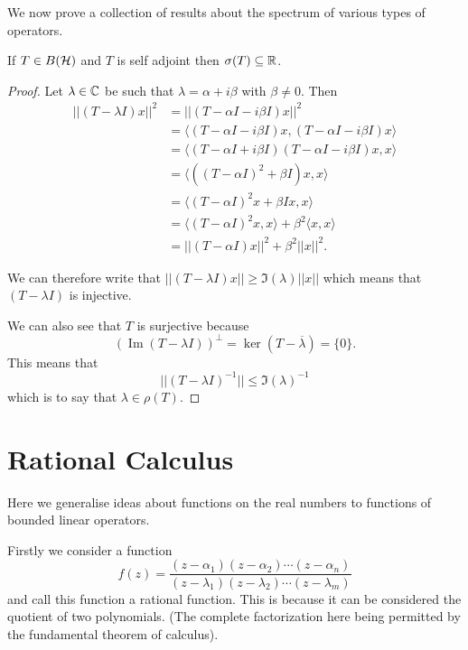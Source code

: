 \documentclass{unswmaths}
\begin{document}
We now prove a collection of results about the spectrum of various types of operators.

\begin{theorem}
	If $ T \in B(\mathcal{H}) $ and $ T $ is self adjoint then $ \sigma(T) \subseteq \mathbb{R} $.
\end{theorem}
\begin{proof}
	Let $ \lambda \in \mathbb{C} $ be such that $ \lambda = \alpha + i \beta $ with $ \beta \neq 0 $.
	Then 
	\begin{align*}
		||(T - \lambda I)x||^2 &= ||( T - \alpha I - i \beta I)x||^2 \\
			&= \langle (T - \alpha I - i \beta I)x, (T - \alpha I - i \beta I)x \rangle \\
			&= \langle (T - \alpha I + i \beta I) (T - \alpha I - i \beta I)x,x \rangle \\
			&= \langle \left((T - \alpha I)^2 + \beta I \right)x,x \rangle \\
			&= \langle (T - \alpha I)^2x + \beta Ix ,x \rangle \\
			&= \langle (T - \alpha I)^2 x, x \rangle + \beta^2 \langle x, x\rangle \\
			&= ||(T-\alpha I)x||^2 + \beta^2 ||x||^2.
	\end{align*}
	
	We can therefore write that $ || (T- \lambda I)x || \geq \Im(\lambda)||x|| $ which means that
	$ (T - \lambda I ) $ is injective.
	
	We can also see that $ T $ is surjective because
	$$
		\left(\operatorname{Im}(T - \lambda I)\right)^\perp = \ker(T - \overline{\lambda}) = \{ 0 \}.
	$$
	This means that $$ || (T - \lambda I)^{-1} || \leq \Im(\lambda)^{-1} $$ which is to say that 
	$ \lambda \in \rho(T) $.
\end{proof}

\section*{Rational Calculus}
Here we generalise ideas about functions on the real numbers to functions of bounded linear operators.

Firstly we consider a function 
$$
	f(z) = \frac{(z-\alpha_1) (z - \alpha_2) \cdots (z - \alpha_n)}{(z - \lambda_1) (z- \lambda_2) \cdots (z - \lambda_m)}
$$
and call this function a rational function. This is because it can be considered the quotient of two polynomials. (The complete factorization here being
permitted by the fundamental theorem of calculus).
\end{document}
